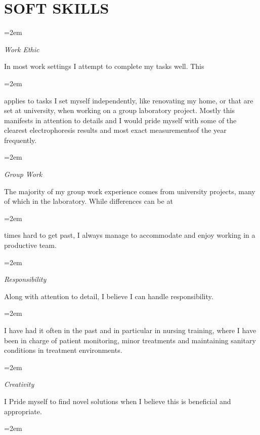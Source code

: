 \documentclass[paper=a4,fontsize=11pt]{scrartcl} %
\newlength{\spacebox}
\newcommand{\sepspace}{\vspace*{1em}}		%
\newcommand{\NewPart}[1]{\section*{\uppercase{#1}}}
\newcommand{\PersonalEntry}[2]{
		\noindent\hangindent=2em\hangafter=0 %
		\parbox{\spacebox}{        %
		\textit{#1}}		       %
		\hspace{1.5em} #2 \par}    %
\newcommand{\SkillsEntry}[2]{      %
		\noindent\hangindent=2em\hangafter=0 %
		\parbox{\spacebox}{        %
		\textit{#1}}			   %
		\hspace{1.5em} \parbox{6\spacebox}{#2} \par}    %
\begin{document}
\clearpage
\NewPart{Soft Skills}{}

\SkillsEntry{Work Ethic}{In most work settings I attempt to complete my tasks well. This }
\vspace{3pt}
\SkillsEntry{}{applies to tasks I set myself independently, like renovating my home, or that are set at university, when working on a group laboratory project. Mostly this manifests in attention to details and I would pride myself with some of the clearest electrophoresis results and most exact measurementsof the year frequently.}
\sepspace

\SkillsEntry{Group Work}{The majority of my group work experience comes from university projects, many of which in the laboratory. While differences can be at }
\vspace{3pt}
\SkillsEntry{}{times hard to get past, I always manage to accommodate and enjoy working in a productive team.}
\sepspace

\SkillsEntry{Responsibility}{Along with attention to detail, I believe I can handle responsibility. }
\vspace{3pt}
\SkillsEntry{}{I have had it often in the past and in particular in nursing training, where  I have been in charge of patient monitoring, minor treatments and maintaining sanitary conditions in treatment environments.}
\sepspace

\SkillsEntry{Creativity}{I Pride myself to find novel solutions when I believe this is beneficial and appropriate.}
\vspace{3pt}
\SkillsEntry{}{}
\sepspace

%

%



\end{document}
